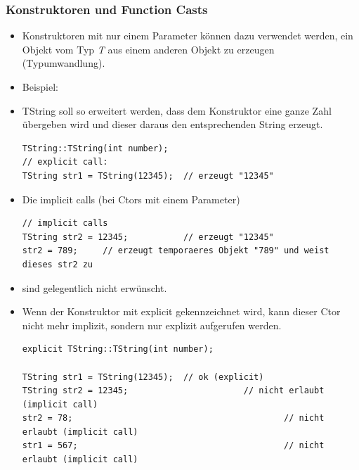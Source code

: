 \subsubsection{Konstruktoren und Function Casts}
\label{sec:Konstruktoren und Function Casts}
\begin{itemize}
	\item Konstruktoren mit nur einem Parameter können dazu verwendet werden, ein Objekt vom Typ \emph{T} aus einem anderen Objekt zu erzeugen (Typumwandlung).
	\item Beispiel:
	\item[\-] TString soll so erweitert werden, dass dem Konstruktor eine ganze Zahl übergeben wird und dieser daraus den entsprechenden String erzeugt.\\
	\vspace{-\baselineskip}
	\begin{minipage}{0.7\linewidth}
\begin{lstlisting}
TString::TString(int number);
// explicit call:
TString str1 = TString(12345);	// erzeugt "12345"
\end{lstlisting}
	\end{minipage}
	\item Die implicit calls (bei Ctors mit einem Parameter)\\
	\begin{minipage}{\linewidth}
	\vspace{-\baselineskip}
\begin{lstlisting}
// implicit calls
TString str2 = 12345;			// erzeugt "12345"
str2 = 789;		// erzeugt temporaeres Objekt "789" und weist dieses str2 zu
\end{lstlisting}
	\end{minipage}
	\item[\-] sind gelegentlich nicht erwünscht.
	\item Wenn der Konstruktor mit explicit gekennzeichnet wird, kann dieser Ctor nicht mehr implizit, sondern nur explizit aufgerufen werden.
	\begin{minipage}{0.85\linewidth}
	\vspace{-\baselineskip}
\begin{lstlisting}
explicit TString::TString(int number);

TString str1 = TString(12345);	// ok (explicit)
TString str2 = 12345;						// nicht erlaubt (implicit call)
str2 = 78;											// nicht erlaubt (implicit call)
str1 = 567;											// nicht erlaubt (implicit call)
\end{lstlisting}
	\end{minipage}
\end{itemize}

